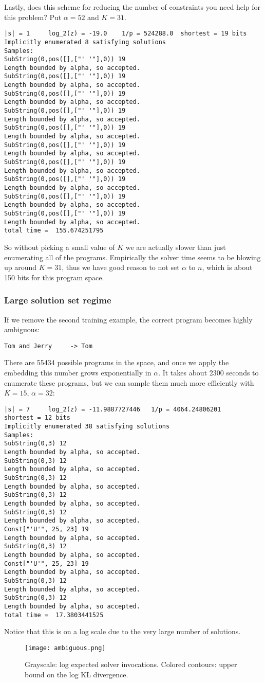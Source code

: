 \documentclass{article}
\begin{document}
Lastly, does this scheme for reducing the number of constraints you need help for this problem?
Put $\alpha = 52$ and $K = 31$.
\begin{verbatim}
|s| = 1 	log_2(z) = -19.0 	1/p = 524288.0 	shortest = 19 bits
Implicitly enumerated 8 satisfying solutions
Samples:
SubString(0,pos([],["' '"],0)) 19
Length bounded by alpha, so accepted.
SubString(0,pos([],["' '"],0)) 19
Length bounded by alpha, so accepted.
SubString(0,pos([],["' '"],0)) 19
Length bounded by alpha, so accepted.
SubString(0,pos([],["' '"],0)) 19
Length bounded by alpha, so accepted.
SubString(0,pos([],["' '"],0)) 19
Length bounded by alpha, so accepted.
SubString(0,pos([],["' '"],0)) 19
Length bounded by alpha, so accepted.
SubString(0,pos([],["' '"],0)) 19
Length bounded by alpha, so accepted.
SubString(0,pos([],["' '"],0)) 19
Length bounded by alpha, so accepted.
SubString(0,pos([],["' '"],0)) 19
Length bounded by alpha, so accepted.
SubString(0,pos([],["' '"],0)) 19
Length bounded by alpha, so accepted.
total time =  155.674251795
\end{verbatim}
So without picking a small value of $K$ we are actually slower than just enumerating all of the programs.
Empirically the solver time seems to be blowing up around $K = 31$,
thus we have good reason to not set $\alpha$ to $n$, which is about 150 bits for this program space.

\subsubsection{Large solution set regime}
If we remove the second training example, the correct program becomes highly ambiguous:
\begin{verbatim}
Tom and Jerry     -> Tom
\end{verbatim}
There are 55434 possible programs in the space, and once we apply the embedding this number grows exponentially in $\alpha$.
It takes about 2300 seconds to enumerate these programs, but we can sample them much more efficiently with $K=15$, $\alpha = 32$:
\begin{verbatim}
|s| = 7 	log_2(z) = -11.9887727446 	1/p = 4064.24806201 	shortest = 12 bits
Implicitly enumerated 38 satisfying solutions
Samples:
SubString(0,3) 12
Length bounded by alpha, so accepted.
SubString(0,3) 12
Length bounded by alpha, so accepted.
SubString(0,3) 12
Length bounded by alpha, so accepted.
SubString(0,3) 12
Length bounded by alpha, so accepted.
SubString(0,3) 12
Length bounded by alpha, so accepted.
Const["'U'", 25, 23] 19
Length bounded by alpha, so accepted.
SubString(0,3) 12
Length bounded by alpha, so accepted.
Const["'U'", 25, 23] 19
Length bounded by alpha, so accepted.
SubString(0,3) 12
Length bounded by alpha, so accepted.
SubString(0,3) 12
Length bounded by alpha, so accepted.
total time =  17.3803441525
\end{verbatim}
Notice that this is on a log scale due to the very large number of solutions.
\begin{figure}
  \texttt{[image: ambiguous.png]}
    \caption{Grayscale: log expected solver invocations. Colored contours: upper bound on the log KL divergence. }
\end{figure}
\end{document}
